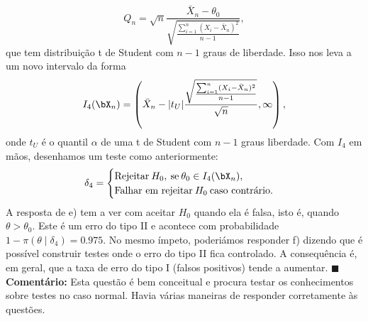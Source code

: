 {\begin{equation*}
    Q_n = \sqrt{n}\frac{\bar{X}_n - \theta_0}{\sqrt{\frac{\sum_{i=1}^n (X_i-\bar{X}_n)^2}{n-1}}},
\end{equation*}
que tem distribuição t de Student com $n-1$ graus de liberdade.
Isso nos leva a um novo intervalo da forma
\begin{equation*}
    I_4(\bX_n) = \left(\bar{X}_n - |t_U|\frac{\sqrt{\frac{\sum_{i=1}^n (X_i-\bar{X}_n)^2}{n-1}}}{\sqrt{n}}, \infty\right),
\end{equation*}
onde $t_U$ é o quantil $\alpha$ de uma t de Student com $n-1$ graus liberdade.
Com $I_4$ em mãos, desenhamos um teste como anteriormente:
\begin{equation*}
    \delta_4 =
    \begin{cases}
    \textrm{Rejeitar}\: H_0, \: \textrm{se}\: \theta_0 \in I_4(\bX_n),\\
    \textrm{Falhar em rejeitar}\: H_0 \: \textrm{caso contrário}.
    \end{cases}
\end{equation*}
A resposta de e) tem a ver com aceitar $H_0$ quando ela é falsa, isto é, quando $\theta > \theta_0$.
Este é um erro do tipo II e acontece com probabilidade $1-\pi(\theta \mid \delta_4) = 0.975$.
No mesmo ímpeto, poderiámos responder f) dizendo que é possível construir testes onde o erro do tipo II fica controlado.
A consequência é, em geral, que a taxa de erro do tipo I (falsos positivos) tende a aumentar.
$\blacksquare$\\
\textbf{Comentário:} Esta questão é bem conceitual e procura testar os conhecimentos sobre testes no caso normal.
Havia várias maneiras de responder corretamente às questões.
}